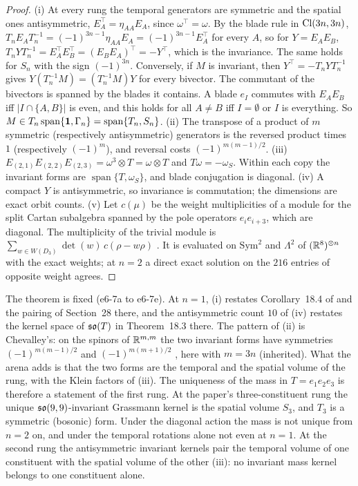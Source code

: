 \begin{proof}
(i) At every rung the temporal generators are symmetric and the spatial ones antisymmetric, $E_A^{\!\top}=\eta_{AA}E_A$, since $\omega^{\!\top}=\omega$. By the
blade rule in $\mathrm{Cl}(3n,3n)$, $T_nE_AT_n^{-1}=(-1)^{3n-1}\eta_{AA}E_A=(-1)^{3n-1}E_A^{\!\top}$ for every $A$, so for $Y=E_AE_B$,
$T_nYT_n^{-1}=E_A^{\!\top}E_B^{\!\top}=(E_BE_A)^{\!\top}=-Y^{\!\top}$, which is the invariance. The same holds for $S_n$ with the sign $(-1)^{3n}$. Conversely, if $M$ is
invariant, then $Y^{\!\top}=-T_nYT_n^{-1}$ gives $Y(T_n^{-1}M)=(T_n^{-1}M)Y$ for every bivector. The commutant of the bivectors is spanned by the blades it
contains. A blade $e_I$ commutes with $E_AE_B$ iff $|I\cap\{A,B\}|$ is even, and this holds for all $A\neq B$ iff $I=\emptyset$ or $I$ is everything. So
$M\in T_n\operatorname{span}\{\mathbf 1,\Gamma_n\}=\operatorname{span}\{T_n,S_n\}$. (ii) The transpose of a product of $m$ symmetric (respectively antisymmetric)
generators is the reversed product times $1$ (respectively $(-1)^m$), and reversal costs $(-1)^{m(m-1)/2}$. (iii) $E_{(2,1)}E_{(2,2)}E_{(2,3)}=\omega^3\otimes T=\omega\otimes T$
and $T\omega=-\omega_S$. Within each copy the invariant forms are $\operatorname{span}\{T,\omega_S\}$, and blade conjugation is diagonal. (iv) A compact $Y$
is antisymmetric, so invariance is commutation; the dimensions are exact orbit counts. (v) Let $c(\mu)$ be the weight multiplicities of a module for
the split Cartan subalgebra spanned by the pole operators $e_ie_{i+3}$, which are diagonal. The multiplicity of the trivial module is
$\sum_{w\in W(D_3)}\det(w)\,c(\rho-w\rho)$ \cite{Humphreys72}. It is evaluated on $\mathrm{Sym}^2$ and $\Lambda^2$ of $(\mathbb{R}^8)^{\otimes n}$ with the exact weights; at $n=2$ a
direct exact solution on the $216$ entries of opposite weight agrees.
\end{proof}

The theorem is fixed (e6-7a to e6-7e). At $n=1$, (i) restates Corollary~18.4 of \cite{ES17} and the pairing of Section~28 there, and the
antisymmetric count $10$ of (iv) restates the kernel space of $\mathfrak{so}(T)$ in Theorem~18.3 there. The pattern of
(ii) is Chevalley's: on the spinors of $\mathbb{R}^{m,m}$ the two invariant forms have symmetries $(-1)^{m(m-1)/2}$ and $(-1)^{m(m+1)/2}$
\cite{Chevalley54,LawsonMichelsohn89}, here with $m=3n$ (inherited). What the arena adds is that the two forms are the temporal and the spatial volume
of the rung, with the Klein factors of (iii). The uniqueness of the mass in $T=e_1e_2e_3$ is therefore a statement of the first rung. At the paper's
three-constituent rung the unique $\mathfrak{so}(9,9)$-invariant Grassmann kernel is the spatial volume $S_3$, and $T_3$ is a symmetric (bosonic) form. Under
the diagonal action the mass is not unique from $n=2$ on, and under the temporal rotations alone not even at $n=1$. At the second rung the
antisymmetric invariant kernels pair the temporal volume of one constituent with the spatial volume of the other (iii): no invariant mass kernel
belongs to one constituent alone.

